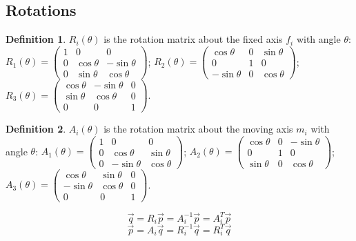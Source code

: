 \documentclass{article}
\theoremstyle{definition}
\newtheorem{definition}{Definition}[section]
\begin{document}
\subsection{Rotations}
\begin{definition}
$R_i(\theta)$ is the rotation matrix about the fixed axis $f_i$ with angle $\theta$:\newline
$R_1(\theta) = 
\begin{pmatrix}
1 & 0 & 0 \\
0 & \cos \theta & -\sin \theta \\
0 & \sin \theta & \cos \theta
\end{pmatrix}$; 
$R_2(\theta) = 
\begin{pmatrix}
\cos \theta & 0 & \sin \theta \\
0 & 1 & 0 \\
-\sin \theta & 0 & \cos \theta
\end{pmatrix}$;\newline
$R_3(\theta) = 
\begin{pmatrix}
\cos \theta & -\sin \theta & 0 \\
\sin \theta & \cos \theta & 0 \\
0 & 0 & 1
\end{pmatrix}$.
\end{definition}

\begin{definition}
$A_i(\theta)$ is the rotation matrix about the moving axis $m_i$ with angle $\theta$:\newline
$A_1(\theta) = 
\begin{pmatrix}
1 & 0 & 0 \\
0 & \cos \theta & \sin \theta \\
0 & -\sin \theta & \cos \theta
\end{pmatrix}$; 
$A_2(\theta) = 
\begin{pmatrix}
\cos \theta & 0 & -\sin \theta \\
0 & 1 & 0 \\
\sin \theta & 0 & \cos \theta
\end{pmatrix}$;\newline
$A_3(\theta) = 
\begin{pmatrix}
\cos \theta & \sin \theta & 0 \\
-\sin \theta & \cos \theta & 0 \\
0 & 0 & 1
\end{pmatrix}$.
\end{definition}

\begin{equation*}
\vec{q} = R_i \vec{p} = A_i^{-1}\vec{p} = A_i^T \vec{p}
\end{equation*}
\begin{equation*}
\vec{p} = A_i \vec{q} = R_i^{-1}\vec{q} = R_i^T \vec{q}
\end{equation*}
\end{document}
